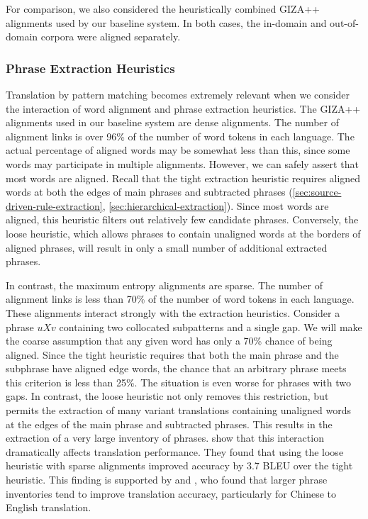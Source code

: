 For comparison, we also considered the heuristically
combined GIZA++ alignments used by our baseline system.
In both cases, the in-domain and out-of-domain corpora
were aligned separately.

\subsubsection{Phrase Extraction Heuristics}
\label{sec:extraction-heuristics}

Translation by pattern matching becomes extremely relevant
when we consider the interaction of word alignment and
phrase extraction heuristics.  The GIZA++ alignments
used in our baseline system are dense
alignments.  The number of alignment links is over 96\%
of the number of word tokens in each language.  The actual
percentage of aligned words may be somewhat less than this,
since some words may participate in multiple alignments.
However, we can safely assert that most words are aligned.
Recall that the tight extraction heuristic requires aligned words
at both the edges of main phrases and subtracted phrases
(\textsection\ref{sec:source-driven-rule-extraction},
\textsection\ref{sec:hierarchical-extraction}).
Since most words are aligned, this heuristic filters out
relatively few candidate phrases.  Conversely, the loose
heuristic, which allows phrases to contain unaligned words
at the borders of aligned phrases, will result in only a
small number of additional extracted phrases.  

In contrast, the maximum entropy alignments are sparse.
The number of alignment links is less than 70\% of the
number of word tokens in each language.  These alignments
interact strongly with the extraction heuristics.
Consider a phrase $uXv$ containing two collocated
subpatterns and a single gap.  We will make the
coarse assumption that any given word has only a 70\%
chance of being aligned.  Since the tight heuristic requires
that both the main phrase and the subphrase have aligned 
edge words, the chance that an arbitrary phrase meets
this criterion is less than 25\%.  The situation is even
worse for phrases with two gaps.  In contrast, the loose
heuristic not only removes this restriction, but permits
the extraction of many variant translations containing
unaligned words at the edges of the main phrase and subtracted
phrases.  This results in the extraction of a very 
large inventory of phrases.
\citet{Ayan:2006:acl-coling} show that this
interaction dramatically affects translation performance.  
They found that using the loose heuristic with sparse alignments
improved accuracy by 3.7 BLEU over the tight heuristic.  
This finding is supported by \citet{Fraser:2007:cl} 
and \citet{Lopez:2006:amta}, who found that larger phrase
inventories tend to improve translation accuracy, particularly
for Chinese to English translation.

